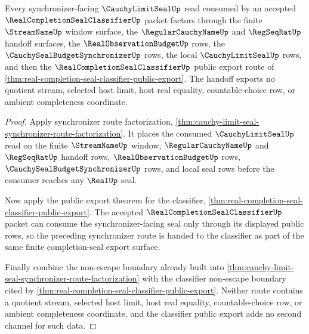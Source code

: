 \begin{theorem}
\label{thm:cauchy-limit-seal-real-completion-classifier-handoff}
Every synchronizer-facing $\CauchyLimitSealUp$ read consumed by an accepted $\RealCompletionSealClassifierUp$ packet factors through the finite $\StreamNameUp$ window surface, the $\RegularCauchyNameUp$ and $\RegSeqRatUp$ handoff surfaces, the $\RealObservationBudgetUp$ rows, the $\CauchySealBudgetSynchronizerUp$ rows, the local $\CauchyLimitSealUp$ rows, and then the $\RealCompletionSealClassifierUp$ public export route of \autoref{thm:real-completion-seal-classifier-public-export}. The handoff exports no quotient stream, selected host limit, host real equality, countable-choice row, or ambient completeness coordinate.
\end{theorem}
\begin{proof}
Apply synchronizer route factorization, \autoref{thm:cauchy-limit-seal-synchronizer-route-factorization}. It places the consumed $\CauchyLimitSealUp$ read on the finite $\StreamNameUp$ window, $\RegularCauchyNameUp$ and $\RegSeqRatUp$ handoff rows, $\RealObservationBudgetUp$ rows, $\CauchySealBudgetSynchronizerUp$ rows, and local seal rows before the consumer reaches any $\RealUp$ seal.

Now apply the public export theorem for the classifier, \autoref{thm:real-completion-seal-classifier-public-export}. The accepted $\RealCompletionSealClassifierUp$ packet can consume the synchronizer-facing seal only through its displayed public rows, so the preceding synchronizer route is handed to the classifier as part of the same finite completion-seal export surface.

Finally combine the non-escape boundary already built into \autoref{thm:cauchy-limit-seal-synchronizer-route-factorization} with the classifier non-escape boundary cited by \autoref{thm:real-completion-seal-classifier-public-export}. Neither route contains a quotient stream, selected host limit, host real equality, countable-choice row, or ambient completeness coordinate, and the classifier public export adds no second channel for such data.
\end{proof}

